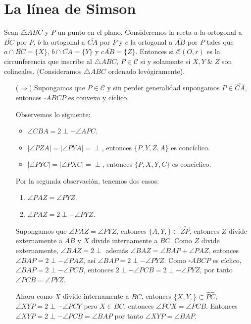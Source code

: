 \section{La línea de Simson}
\begin{teo}\label{TLS}
Sean $\triangle ABC$ y $P$ un punto en el plano. Consideremos la recta $a$ la ortogonal a $\overline{BC}$ por $P$, $b$ la ortogonal a $\overline{CA}$ por $P$ y $c$ la ortogonal a $\overline{AB}$ por $P$ tales que $a\cap\overline{BC}=\{X\}$, $b\cap\overline{CA}=\{Y\}$ y $c\overline{AB}=\{Z\}$. Entonces si $\mathcal{C}(O,r)$ es la circunferencia que inscribe al $\triangle ABC$, $P\in\mathcal{C}$ si y solamente si $X,Y\;\&\;Z$ son colineales. (Consideramos $\triangle ABC$ ordenado levógiramente).
\end{teo}
\begin{dem}
\begin{enumerate}
\item [($\Rightarrow$)]
Supongamos que $P\in\mathcal{C}$ y sin perder generalidad supongamos $P\in\widehat{CA}$, entonces $\square ABCP$ es convexo y cíclico. 

Observemos lo siguiente:
\begin{itemize}
\item $\angle CBA=2\perp-\angle APC$.
\item $|\angle PZA|=|\angle PYA|=\perp$, entonces $\{P,Y,Z,A\}$ es concíclico.
\item $|\angle PYC|=|\angle PXC|=\perp$, entonces $\{P,X,Y,C\}$ es concíclico. 
\end{itemize}

Por la segunda observación, tenemos dos casos:
\begin{enumerate}
\item $\angle PAZ=\angle PYZ$.
\item $\angle PAZ=2\perp -\angle PYZ$. 
\end{enumerate}
Supongamos que $\angle PAZ=\angle PYZ$, entonces $\{A,Y,\}\subset\widehat{ZP}$, entonces $Z$ divide externamente a $AB$ y $X$ divide internamente a $BC$. Como $Z$ divide externamente, $\angle BAZ=2\perp$ además $\angle BAZ=\angle BAP+\angle PAZ$, entonces $\angle BAP=2\perp -\angle PAZ$, así $\angle BAP=2\perp - \angle PYZ$. 
Como $\square ABCP$ es cíclico, $\angle BAP=2\perp - \angle PCB$, entonces $2\perp -\angle PCB=2\perp - \angle PYZ$, por tanto $\angle PCB=\angle PYZ$.

Ahora como $X$ divide internamente a $BC$, entonces $\{X,Y,\}\subset\widehat{PC}$, $\angle XYP=2\perp -\angle PCY$ pero $X\in BC$, entonces $\angle PCX=\angle PCB$. Entonces $\angle XYP=2\perp -\angle PCB=\angle BAP$ por tanto $\angle XYP=\angle BAP$. 


\end{enumerate}
\end{dem}
